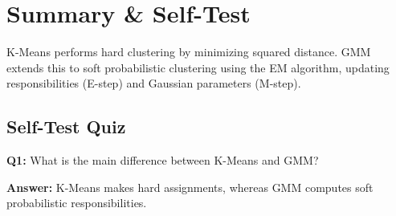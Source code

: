 \documentclass[a4paper,11pt]{article}
\newcommand{\flipanswer}[1]{\par\noindent\textbf{Answer:} #1}
\begin{document}
\section{Summary \& Self-Test}
\begin{keytake}
K-Means performs hard clustering by minimizing squared distance. GMM extends this to soft probabilistic clustering using the EM algorithm, updating responsibilities (E-step) and Gaussian parameters (M-step).
\end{keytake}

\subsection{Self-Test Quiz}
\textbf{Q1:} What is the main difference between K-Means and GMM?

\flipanswer{K-Means makes hard assignments, whereas GMM computes soft probabilistic responsibilities.}
\end{document}
